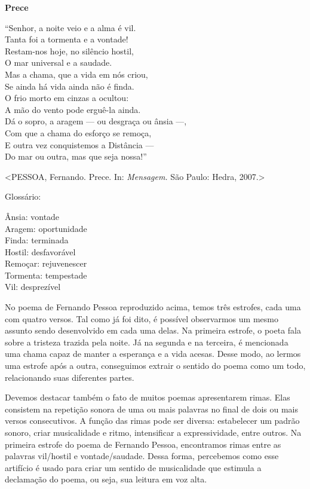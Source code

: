 \textbf{Prece}

``Senhor, a noite veio e a alma é vil.\\
Tanta foi a tormenta e a vontade!\\
Restam-nos hoje, no silêncio hostil,\\
O mar universal e a saudade.\\[2\baselineskip]Mas a chama, que a vida em
nós criou,\\
Se ainda há vida ainda não é finda.\\
O frio morto em cinzas a ocultou:\\
A mão do vento pode erguê-la ainda.\\[2\baselineskip]Dá o sopro, a
aragem --- ou desgraça ou ânsia ---,\\
Com que a chama do esforço se remoça,\\
E outra vez conquistemos a Distância ---\\
Do mar ou outra, mas que seja nossa!''

\textless{}PESSOA, Fernando. Prece. In: \emph{Mensagem.} São Paulo:
Hedra, 2007.\textgreater{}

Glossário:

Ânsia: vontade\\
Aragem: oportunidade\\
Finda: terminada\\
Hostil: desfavorável\\
Remoçar: rejuvenescer\\
Tormenta: tempestade\\
Vil: desprezível

No poema de Fernando Pessoa reproduzido acima, temos três estrofes, cada
uma com quatro versos. Tal como já foi dito, é possível observarmos um
mesmo assunto sendo desenvolvido em cada uma delas. Na primeira estrofe,
o poeta fala sobre a tristeza trazida pela noite. Já na segunda e na
terceira, é mencionada uma chama capaz de manter a esperança e a vida
acesas. Desse modo, ao lermos uma estrofe após a outra, conseguimos
extrair o sentido do poema como um todo, relacionando suas diferentes
partes.

Devemos destacar também o fato de muitos poemas apresentarem rimas. Elas
consistem na repetição sonora de uma ou mais palavras no final de dois
ou mais versos consecutivos. A função das rimas pode ser diversa:
estabelecer um padrão sonoro, criar musicalidade e ritmo, intensificar a
expressividade, entre outros. Na primeira estrofe do poema de Fernando
Pessoa, encontramos rimas entre as palavras vil/hostil e
vontade/saudade. Dessa forma, percebemos como esse artifício é usado
para criar um sentido de musicalidade que estimula a declamação do
poema, ou seja, sua leitura em voz alta.

